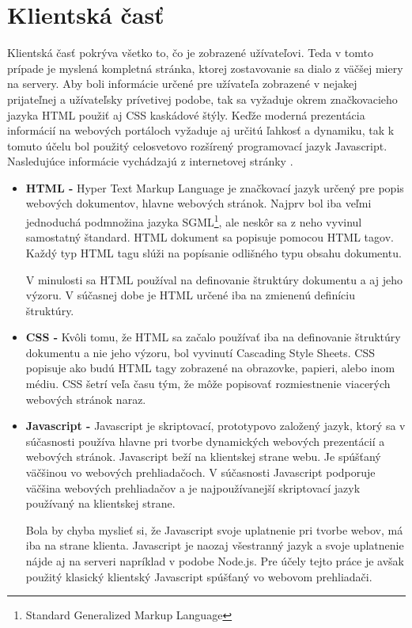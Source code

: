 \section{Klientská časť}
\label{sec:klient}
Klientská časť pokrýva všetko to, čo je zobrazené užívateľovi. Teda v tomto prípade je myslená kompletná stránka, ktorej zostavovanie sa dialo z väčšej miery na servery. Aby boli informácie určené pre užívateľa zobrazené v nejakej prijateľnej a užívateľsky prívetivej podobe, tak sa vyžaduje okrem značkovacieho jazyka HTML použiť aj CSS kaskádové štýly. Keďže moderná prezentácia informácií na webových portáloch vyžaduje aj určitú ľahkosť a dynamiku, tak k tomuto účelu bol použitý celosvetovo rozšírený programovací jazyk Javascript. Nasledujúce informácie vychádzajú z internetovej stránky \cite{w3}.

\begin{itemize} 
\item \textbf{HTML -} Hyper Text Markup Language je značkovací jazyk určený pre popis webových dokumentov, hlavne webových stránok. Najprv bol iba veľmi jednoduchá podmnožina jazyka SGML\footnote{Standard Generalized Markup Language}, ale neskôr sa z neho vyvinul samostatný štandard. HTML dokument sa popisuje pomocou HTML tagov. Každý typ HTML tagu slúži na popísanie odlišného typu obsahu dokumentu.  

V minulosti sa HTML používal na definovanie štruktúry dokumentu a aj jeho výzoru. V súčasnej dobe je HTML určené iba na zmienenú definíciu štruktúry.

\item \textbf{CSS -} Kvôli tomu, že HTML sa začalo používať iba na definovanie štruktúry dokumentu a nie jeho výzoru, bol vyvinutí Cascading Style Sheets. CSS popisuje ako budú HTML tagy zobrazené na obrazovke, papieri, alebo inom médiu. CSS šetrí veľa času tým, že môže popisovať rozmiestnenie viacerých webových stránok naraz.

\item \textbf{Javascript -} Javascript je skriptovací, prototypovo založený jazyk, ktorý sa v súčasnosti používa hlavne pri tvorbe dynamických webových prezentácií a webových stránok. Javascript beží na klientskej strane webu. Je spúšťaný väčšinou vo webových prehliadačoch. V súčasnosti Javascript podporuje väčšina webových prehliadačov a je najpoužívanejší skriptovací jazyk používaný na klientskej strane. 

Bola by chyba myslieť si, že Javascript svoje uplatnenie pri tvorbe webov, má iba na strane klienta. Javascript je naozaj všestranný jazyk a svoje uplatnenie nájde aj na serveri napríklad v podobe Node.js. Pre účely tejto práce je avšak použitý klasický klientský Javascript spúšťaný vo webovom prehliadači.


\end{itemize}
